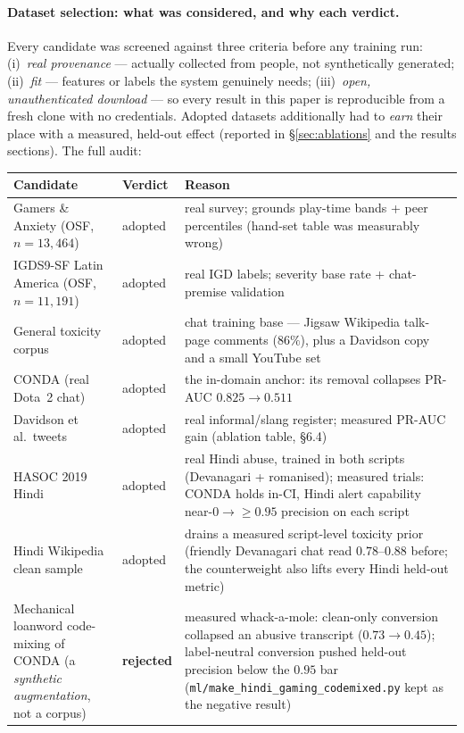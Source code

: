 \documentclass[11pt,a4paper]{article}
\begin{document}
\paragraph{Dataset selection: what was considered, and why each verdict.}
Every candidate was screened against three criteria before any training run:
(i)~\emph{real provenance} --- actually collected from people, not synthetically
generated; (ii)~\emph{fit} --- features or labels the system genuinely needs;
(iii)~\emph{open, unauthenticated download} --- so every result in this paper is
reproducible from a fresh clone with no credentials. Adopted datasets additionally
had to \emph{earn} their place with a measured, held-out effect (reported in
\S\ref{sec:ablations} and the results sections). The full audit:

\begin{center}
\begin{tabularx}{\linewidth}{p{3.4cm}p{1.7cm}X}
\toprule
\textbf{Candidate} & \textbf{Verdict} & \textbf{Reason} \\
\midrule
Gamers \& Anxiety (OSF, $n{=}13{,}464$) & adopted & real survey; grounds play-time bands + peer percentiles (hand-set table was measurably wrong) \\
IGDS9-SF Latin America (OSF, $n{=}11{,}191$) & adopted & real IGD labels; severity base rate + chat-premise validation \\
General toxicity corpus~\cite{jigsaw2018} & adopted & chat training base --- Jigsaw Wikipedia talk-page comments ($86\%$), plus a Davidson copy and a small YouTube set \\
CONDA (real Dota~2 chat) & adopted & the in-domain anchor: its removal collapses PR-AUC $0.825 \rightarrow 0.511$ \\
Davidson et al.\ tweets & adopted & real informal/slang register; measured PR-AUC gain (ablation table, \S6.4) \\
HASOC 2019 Hindi~\cite{hasoc2019} & adopted & real Hindi abuse, trained in both scripts (Devanagari + romanised); measured trials: CONDA holds in-CI, Hindi alert capability near-$0 \rightarrow \geq 0.95$ precision on each script \\
Hindi Wikipedia clean sample~\cite{wikihi} & adopted & drains a measured script-level toxicity prior (friendly Devanagari chat read $0.78$--$0.88$ before; the counterweight also lifts every Hindi held-out metric) \\
Mechanical loanword code-mixing of CONDA (a \emph{synthetic augmentation}, not a corpus) & \textbf{rejected} & measured whack-a-mole: clean-only conversion collapsed an abusive transcript ($0.73 \rightarrow 0.45$); label-neutral conversion pushed held-out precision below the $0.95$ bar (\texttt{ml/make\_hindi\_gaming\_codemixed.py} kept as the negative result) \\

\end{tabularx}
\end{center}
\end{document}
